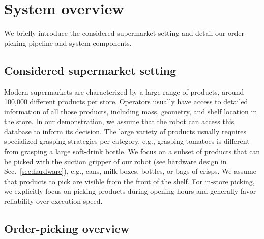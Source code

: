 \section{System overview}

We briefly introduce the considered supermarket setting and detail our order-picking pipeline and system components.

\subsection{Considered supermarket setting}

Modern supermarkets are characterized by a large range of products, around 100,000
different products per store.  
Operators usually have access to detailed information of all those
products, including mass, geometry, and shelf location in the store. 
In our demonstration, we assume that the robot can access this database to inform its decision.
The large variety of products usually requires specialized grasping strategies per category, e.g., grasping tomatoes is different from grasping a large soft-drink bottle.
We focus on a subset of products that can be picked with the suction gripper of our robot (see hardware design in Sec.~\ref{sec:hardware}), e.g., cans, milk boxes, bottles, or bags of crisps. 
We assume that products to
pick are visible from the front of the shelf. %
For in-store picking, we explicitly focus on picking products during opening-hours and generally favor reliability over execution speed. 



\subsection{Order-picking overview}
\label{sec:order_system_overview}



